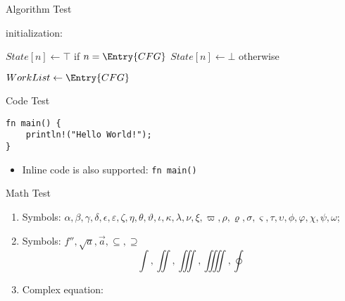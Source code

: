 \begin{frame}{Algorithm Test}
    \IncMargin{1em}
    \begin{algorithm}[H]
      \DontPrintSemicolon
      \SetVlineSkip{0pt}
      \scriptsize
      initialization: \parbox[t]{\linewidth}{
        $State[n] \leftarrow \top$ if $n=\Entry{CFG}$\;
        $State[n] \leftarrow \bot$ otherwise\;}
    
      $WorkList \leftarrow \Entry{CFG}$\;
      \SetAlCapHSkip{.5em}
      \caption{Basic algorithm for Abstract Interpretation}
    \end{algorithm}
\end{frame}

\begin{frame}[fragile]{Code Test}
    \begin{verbatim}
fn main() {
    println!("Hello World!");
}
    \end{verbatim}
	\begin{itemize}
		\item Inline code is also supported: \texttt{fn main() { }}
	\end{itemize}
\end{frame}

\begin{frame}{Math Test}
    \begin{enumerate}
        \item Symbols: $\alpha,\beta,\gamma,\delta,\epsilon,\varepsilon,\zeta,\eta,\theta,\vartheta,\iota,\kappa,\lambda,\nu,\xi,\varpi,\rho,\varrho,\sigma,\varsigma,\tau,\upsilon,\phi,\varphi,\chi,\psi,\omega$;
        \item Symbols: $f'',\sqrt{a},\overrightarrow{a},\subseteq,\supseteq$
        \[\int,\iint,\iiint,\iiiint,\oint\]
        \item Complex equation:
    \end{enumerate}
\end{frame}

